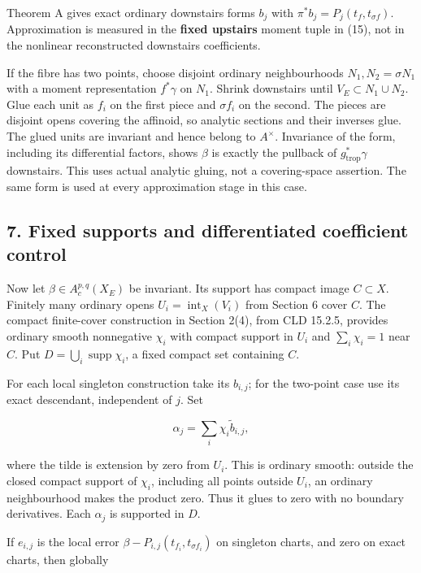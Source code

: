 \documentclass[
  11pt,
]{article}
\begin{document}
Theorem A gives exact ordinary downstairs forms \(b_j\) with
\(\pi^*b_j=P_j(t_f,t_{\sigma f})\). Approximation is measured in the
\textbf{fixed upstairs} moment tuple in (15), not in the nonlinear
reconstructed downstairs coefficients.

If the fibre has two points, choose disjoint ordinary neighbourhoods
\(N_1,N_2=\sigma N_1\) with a moment representation \(f^*\gamma\) on
\(N_1\). Shrink downstairs until \(V_E\subset N_1\cup N_2\). Glue each
unit as \(f_i\) on the first piece and \(\sigma f_i\) on the second. The
pieces are disjoint opens covering the affinoid, so analytic sections
and their inverses glue. The glued units are invariant and hence belong
to \(A^\times\). Invariance of the form, including its differential
factors, shows \(\beta\) is exactly the pullback of
\(g_{\mathrm{trop}}^*\gamma\) downstairs. This uses actual analytic
gluing, not a covering-space assertion. The same form is used at every
approximation stage in this case.

\subsection{7. Fixed supports and differentiated coefficient
control}\label{fixed-supports-and-differentiated-coefficient-control}

Now let \(\beta\in A_c^{p,q}(X_E)\) be invariant. Its support has
compact image \(C\subset X\). Finitely many ordinary opens
\(U_i=\operatorname{int}_X(V_i)\) from Section 6 cover \(C\). The compact finite-cover construction in
Section 2(4), from CLD 15.2.5, provides ordinary smooth nonnegative \(\chi_i\) with compact support in
\(U_i\) and \(\sum_i\chi_i=1\) near \(C\). Put
\(D=\bigcup_i\operatorname{supp}\chi_i\), a fixed compact set containing
\(C\).

For each local singleton construction take its \(b_{i,j}\); for the
two-point case use its exact descendant, independent of \(j\). Set

\[\alpha_j=\sum_i\widetilde{\chi_i b_{i,j}}, \tag{16}\]

where the tilde is extension by zero from \(U_i\). This is ordinary
smooth: outside the closed compact support of \(\chi_i\), including all
points outside \(U_i\), an ordinary neighbourhood makes the product
zero. Thus it glues to zero with no boundary derivatives. Each
\(\alpha_j\) is supported in \(D\).

If \(e_{i,j}\) is the local error
\(\beta-P_{i,j}(t_{f_i},t_{\sigma f_i})\) on singleton charts, and zero
on exact charts, then globally
\end{document}
